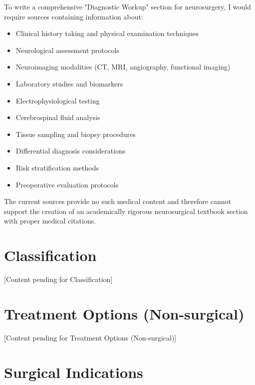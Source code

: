 \documentclass[12pt,a4paper]{article}
\begin{document}
To write a comprehensive "Diagnostic Workup" section for neurosurgery, I would require sources containing information about:

\begin{itemize}
\item Clinical history taking and physical examination techniques
\item Neurological assessment protocols
\item Neuroimaging modalities (CT, MRI, angiography, functional imaging)
\item Laboratory studies and biomarkers
\item Electrophysiological testing
\item Cerebrospinal fluid analysis
\item Tissue sampling and biopsy procedures
\item Differential diagnosis considerations
\item Risk stratification methods
\item Preoperative evaluation protocols
\end{itemize}

The current sources provide no such medical content and therefore cannot support the creation of an academically rigorous neurosurgical textbook section with proper medical citations.







\section{Classification}




[Content pending for Classification]







\section{Treatment Options (Non-surgical)}




[Content pending for Treatment Options (Non-surgical)]







\section{Surgical Indications}
\end{document}
